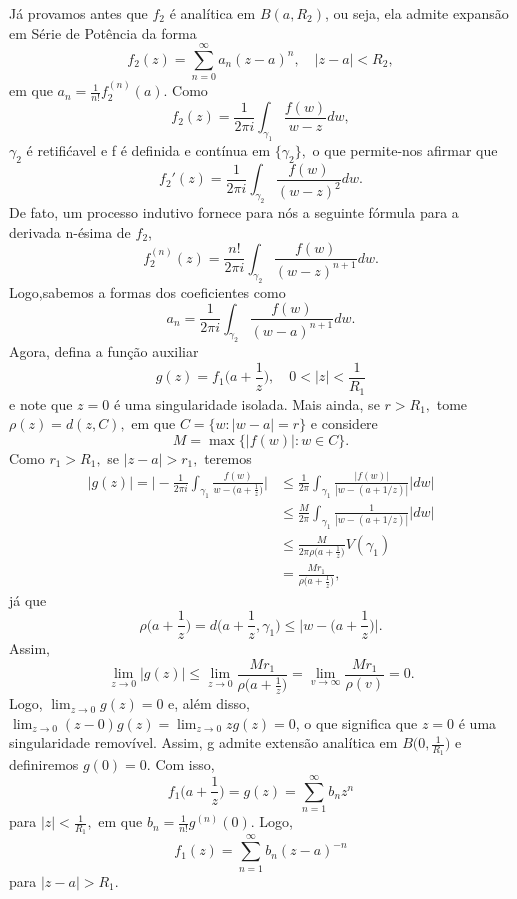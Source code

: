 \documentclass[ComplexAnalysis/complex.tex]{subfiles}
\begin{document}
\begin{proof*}
	Já provamos antes que \(f_{2}\) é analítica em \(B(a, R_{2})\), ou seja, ela admite expansão em Série de Potência da forma
	\[
		f_{2}(z) = \sum\limits_{n=0}^{\infty}a_{n}(z-a)^{n},\quad |z-a| < R_{2},
	\]
	em que \(a_{n} = \frac{1}{n!}f_{2}^{(n)}(a).\) Como
	\[
		f_{2}(z) = \frac{1}{2\pi i}\int_{\gamma _{1}}^{}\frac{f(w)}{w-z}dw,
	\]
	\(\gamma _{2}\) é retifićavel e f é definida e contínua em \(\{\gamma_{2}\},\) o que permite-nos afirmar que
	\[
		f_{2}'(z) = \frac{1}{2\pi i}\int_{\gamma_{2}}^{}\frac{f(w)}{(w-z)^{2}}dw.
	\]
	De fato, um processo indutivo fornece para nós a seguinte fórmula para a derivada n-ésima de \(f_{2}\),
	\[
		f_{2}^{(n)}(z) = \frac{n!}{2\pi i}\int_{\gamma _{2}}^{}\frac{f(w)}{(w-z)^{n+1}}dw.
	\]
	Logo,sabemos a formas dos coeficientes como
	\[
		a_{n} = \frac{1}{2\pi i}\int_{\gamma _{2}}^{}\frac{f(w)}{(w-a)^{n+1}}dw.
	\]
	Agora, defina a função auxiliar
	\[
		g(z) = f_{1}\biggl(a + \frac{1}{z}\biggr),\quad 0 < |z| < \frac{1}{R_{1}}
	\]
	e note que \(z=0\) é uma singularidade isolada. Mais ainda, se \(r > R_{1},\) tome \(\rho (z) = d(z, C),\)
	em que \(C = \{w: |w-a| = r\}\) e considere
	\[
		M = \max\{|f(w)|: w\in C\}.
	\]
	Como \(r_{1} >  R_{1},\) se \(|z-a| > r_{1},\) teremos
	\begin{align*}
		|g(z)| = \biggl|-\frac{1}{2\pi i}\int_{\gamma _{1}}^{}\frac{f(w)}{w-\bigl(a + \frac{1}{z}\bigr)}\biggr| & \leq \frac{1}{2\pi }\int_{\gamma _{1}}^{}\frac{|f(w)|}{|w - (a+1/z)|}|dw| \\
		                                                                                                        & \leq \frac{M}{2\pi }\int_{\gamma _{1}}^{}\frac{1}{|w-(a+1/z)|}|dw|        \\
		                                                                                                        & \leq \frac{M}{2\pi \rho \bigl(a+\frac{1}{z}\bigr)}V(\gamma _{1})          \\
		                                                                                                        & = \frac{Mr_{1}}{\rho \bigl(a + \frac{1}{z}\bigr)},
	\end{align*}
	já que
	\[
		\rho \biggl(a + \frac{1}{z}\biggr) = d \biggl(a + \frac{1}{z}, \gamma _{1}\biggr) \leq \biggl\vert w-\biggl(a + \frac{1}{z}\biggr)\biggr\vert.
	\]
	Assim,
	\[
		\lim_{z\to 0}|g(z)|\leq \lim_{z\to 0}\frac{Mr_{1}}{\rho \bigl(a + \frac{1}{z}\bigr)} = \lim_{v\to \infty}\frac{Mr_{1}}{\rho (v)}=0.
	\]
	Logo, \(\lim_{z\to 0}g(z) = 0\) e, além disso, \(\lim_{z\to 0}(z-0)g(z)=\lim_{z\to 0}zg(z) = 0\), o que significa que \(z=0\) é uma singularidade
	removível. Assim, g admite extensão analítica em \(B \biggl(0, \frac{1}{R_{1}}\biggr)\) e definiremos \(g(0) = 0.\) Com isso,
	\[
		f_{1}\biggl(a + \frac{1}{z}\biggr)=g(z) = \sum\limits_{n=1}^{\infty}b_{n}z^{n}
	\]
	para \(|z| < \frac{1}{R_{1}},\) em que \(b_{n} = \frac{1}{n!}g^{(n)}(0).\) Logo,
	\[
		f_{1}(z) = \sum\limits_{n=1}^{\infty}b_{n}(z-a)^{-n}
	\]
	para \(|z-a| > R_{1}.\)


\end{proof*}
\end{document}
